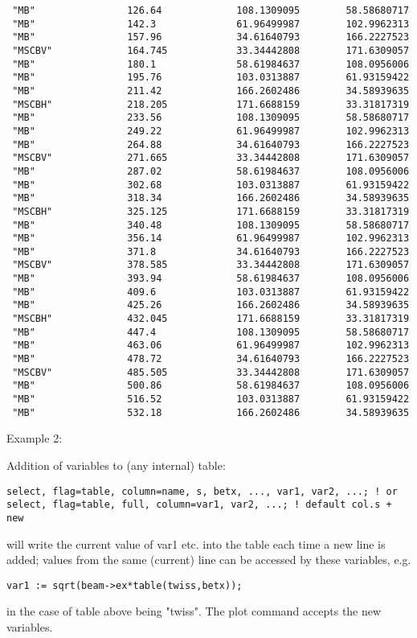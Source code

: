 \begin{verbatim}
 "MB"                126.64             108.1309095        58.58680717       
 "MB"                142.3              61.96499987        102.9962313       
 "MB"                157.96             34.61640793        166.2227523       
 "MSCBV"             164.745            33.34442808        171.6309057       
 "MB"                180.1              58.61984637        108.0956006       
 "MB"                195.76             103.0313887        61.93159422       
 "MB"                211.42             166.2602486        34.58939635       
 "MSCBH"             218.205            171.6688159        33.31817319       
 "MB"                233.56             108.1309095        58.58680717       
 "MB"                249.22             61.96499987        102.9962313       
 "MB"                264.88             34.61640793        166.2227523       
 "MSCBV"             271.665            33.34442808        171.6309057       
 "MB"                287.02             58.61984637        108.0956006       
 "MB"                302.68             103.0313887        61.93159422       
 "MB"                318.34             166.2602486        34.58939635       
 "MSCBH"             325.125            171.6688159        33.31817319       
 "MB"                340.48             108.1309095        58.58680717       
 "MB"                356.14             61.96499987        102.9962313       
 "MB"                371.8              34.61640793        166.2227523       
 "MSCBV"             378.585            33.34442808        171.6309057       
 "MB"                393.94             58.61984637        108.0956006       
 "MB"                409.6              103.0313887        61.93159422       
 "MB"                425.26             166.2602486        34.58939635       
 "MSCBH"             432.045            171.6688159        33.31817319       
 "MB"                447.4              108.1309095        58.58680717       
 "MB"                463.06             61.96499987        102.9962313       
 "MB"                478.72             34.61640793        166.2227523       
 "MSCBV"             485.505            33.34442808        171.6309057       
 "MB"                500.86             58.61984637        108.0956006       
 "MB"                516.52             103.0313887        61.93159422       
 "MB"                532.18             166.2602486        34.58939635       
\end{verbatim}

 Example 2: 

 Addition of variables to (any internal) table: 
\begin{verbatim}
select, flag=table, column=name, s, betx, ..., var1, var2, ...; ! or
select, flag=table, full, column=var1, var2, ...; ! default col.s + new
\end{verbatim} 
will write the current value of var1 etc. into the table each time a new
line is added; values from the same (current) line can be accessed by
these variables, e.g.  
\begin{verbatim}
var1 := sqrt(beam->ex*table(twiss,betx));
\end{verbatim} 
in the case of table above being "twiss". The plot command accepts the
new variables.  

